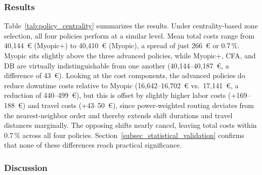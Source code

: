 \documentclass[12pt,oneside]{article}
\begin{document}
\subsubsection*{Results}

Table~\ref{tab:policy_centrality} summarizes the results. Under centrality-based zone selection, all four policies perform at a similar level. Mean total costs range from 40{,}144~€ (Myopic+) to 40{,}410~€ (Myopic), a spread of just 266~€ or 0.7\,\%. Myopic sits slightly above the three advanced policies, while Myopic+, CFA, and DB are virtually indistinguishable from one another (40{,}144--40{,}187~€, a difference of 43~€). Looking at the cost components, the advanced policies do reduce downtime costs relative to Myopic (16{,}642--16{,}702~€ vs.\ 17{,}141~€, a reduction of 440--499~€), but this is offset by slightly higher labor costs (+169--188~€) and travel costs (+43--50~€), since power-weighted routing deviates from the nearest-neighbor order and thereby extends shift durations and travel distances marginally. The opposing shifts nearly cancel, leaving total costs within 0.7\,\% across all four policies. Section~\ref{subsec_statistical_validation} confirms that none of these differences reach practical significance.

\begin{table}[H]
\centering
\caption{Policy comparison under centrality-based zone selection (500 runs each). SD refers to the standard deviation of total costs across runs.}
\label{tab:policy_centrality}
\end{table}

\subsubsection*{Discussion}
\end{document}
